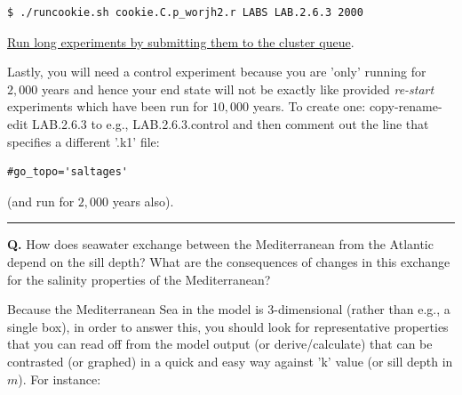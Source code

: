 \vspace{-2mm}\small\begin{verbatim}
$ ./runcookie.sh cookie.C.p_worjh2.r LABS LAB.2.6.3 2000
\end{verbatim}\normalsize\vspace{-2mm}

\vspace{1mm}
\noindent \uline{Run long experiments by submitting them to the cluster queue}.

\vspace{1mm}
\noindent Lastly, you will need a control experiment because you are 'only' running for $2,000$ years and hence your end state will not be exactly like provided \textit{re-start} experiments which have been run for $10,000$ years. To create one: copy-rename-edit \textsf{\footnotesize LAB.2.6.3} to e.g., \textsf{\footnotesize LAB.2.6.3.control} and then comment out the line that specifies a different '.k1' file:

\vspace{-2mm}\small\begin{verbatim}
#go_topo='saltages'
\end{verbatim}\normalsize\vspace{-2mm}
(and run for $2,000$ years also).

\vspace{1mm}\noindent\rule{4cm}{0.5pt}\vspace{2mm}

\noindent \textbf{Q.} How does seawater exchange between the Mediterranean from the Atlantic depend on the sill depth? What are the consequences of changes in this exchange for the salinity properties of the Mediterranean?

Because the Mediterranean Sea in the model is 3-dimensional (rather than e.g., a single box), in order to answer this, you should look for representative properties that you can read off from the model output (or derive/calculate) that can be contrasted (or graphed) in a quick and easy way against 'k' value (or sill depth in $m$). For instance:


